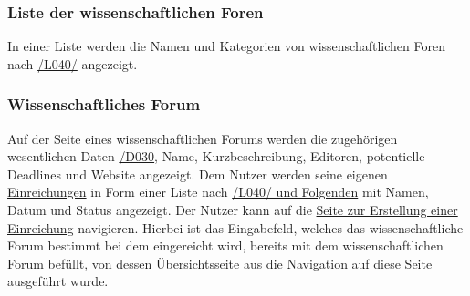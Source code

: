 \subsubsection{Liste der wissenschaftlichen Foren}
\begin{description}
     In einer Liste werden die Namen und Kategorien von wissenschaftlichen Foren nach \hyperref[leist:40]{/L040/}
    angezeigt.
\end{description}

\subsubsection{Wissenschaftliches Forum} \label{nut:wissfor}
\begin{description}
     Auf der Seite eines wissenschaftlichen Forums werden die
    zugehörigen wesentlichen Daten \hyperref[d030]{/D030},
    Name, Kurzbeschreibung, Editoren, potentielle Deadlines und Website angezeigt.
     Dem Nutzer werden seine eigenen \hyperref[nut:ein]{Einreichungen} in Form einer Liste  nach \hyperref[leist:40]{/L040/ und Folgenden}
    mit Namen, Datum und Status angezeigt.
     Der Nutzer kann auf die \hyperref[nut:eein]{Seite zur Erstellung einer Einreichung} navigieren. Hierbei ist
    das Eingabefeld, welches das wissenschaftliche Forum bestimmt bei dem eingereicht wird, bereits mit
    dem wissenschaftlichen Forum befüllt, von dessen \hyperref[nut:wissFor]{Übersichtsseite} aus die Navigation auf diese
    Seite ausgeführt wurde.
\end{description}

